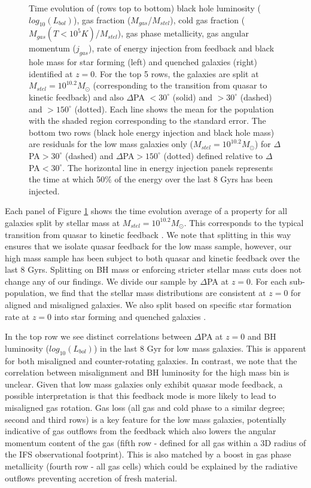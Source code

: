 \documentclass[fleqn,usenatbib]{mnras}
\begin{document}
\begin{figure}
    \caption{Time evolution of (rows top to bottom) black hole luminosity ($log_{10}(L_{bol})$), gas fraction ($M_{gas}$/$M_{stel}$), cold gas fraction ($M_{gas}(T < 10^{5}K)$/$M_{stel}$), gas phase metallicity, gas angular momentum ($j_{gas}$), rate of energy injection from feedback and black hole mass for star forming (left) and quenched galaxies (right) identified at $z=0$. For the top 5 rows, the galaxies are split at $M_{stel} = 10^{10.2}M_{\odot}$ (corresponding to the transition from quasar to kinetic feedback) and also $\Delta$PA $< 30^{\circ}$ (solid) and $> 30^{\circ}$ (dashed) and  $> 150^{\circ}$ (dotted). Each line shows the mean for the population with the shaded region corresponding to the standard error. The bottom two rows (black hole energy injection and black hole mass) are residuals for the low mass galaxies only ($M_{stel} = 10^{10.2}M_{\odot}$) for $\Delta$PA$ > 30^{\circ}$ (dashed) and $\Delta$PA$ > 150^{\circ}$ (dotted) defined relative to $\Delta$PA$ < 30^{\circ}$. The horizontal line in energy injection panels represents the time at which 50\% of the energy over the last 8 Gyrs has been injected.
    }
    \label{fig:overall_pop}
\end{figure}

Each panel of Figure \ref{fig:overall_pop} shows the time evolution average of a property for all galaxies split by stellar mass at $M_{stel} = 10^{10.2}M_{\odot}$. This corresponds to the typical transition from quasar to kinetic feedback \citep[i.e. $M_{BH} \approx 10^{8}M_{\odot}$, see Fig 1 in][]{li2019}. We note that splitting in this way ensures that we isolate quasar feedback for the low mass sample, however, our high mass sample has been subject to both quasar and kinetic feedback over the last 8 Gyrs. Splitting on BH mass or enforcing stricter stellar mass cuts does not change any of our findings. We divide our sample by $\Delta$PA at $z=0$. For each sub-population, we find that the stellar mass distributions are consistent at $z=0$ for aligned and misaligned galaxies. We also split based on specific star formation rate at $z=0$ into star forming and quenched galaxies \cite[defined by distance from the star forming main-sequence in][]{pillepich2019}. 

In the top row we see distinct correlations between $\Delta$PA at $z=0$ and BH luminosity ($log_{10}(L_{bol})$) in the last 8 Gyr for low mass galaxies. This is apparent for both misaligned and counter-rotating galaxies. In contrast, we note that the correlation between misalignment and BH luminosity for the high mass bin is unclear. Given that low mass galaxies only exhibit quasar mode feedback, a possible interpretation is that this feedback mode is more likely to lead to misaligned gas rotation. Gas loss (all gas and cold phase to a similar degree; second and third rows) is a key feature for the low mass galaxies, potentially indicative of gas outflows from the feedback which also lowers the angular momentum content of the gas (fifth row - defined for all gas within a 3D radius of the IFS observational footprint). This is also matched by a boost in gas phase metallicity (fourth row - all gas cells) which could be explained by the radiative outflows preventing accretion of fresh material. 
\end{document}
